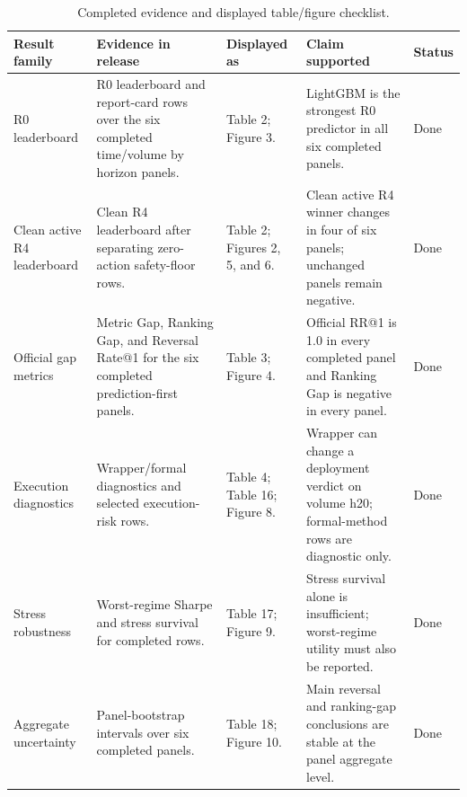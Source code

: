 \begin{table}[t]
\centering
\caption{Completed evidence and displayed table/figure checklist.}
\label{tab:table_20_display_checklist}
\begin{tabular}{lllll}
\toprule
Result family & Evidence in release & Displayed as & Claim supported & Status \\
\midrule
R0 leaderboard & R0 leaderboard and report-card rows over the six completed time/volume by horizon panels. & Table 2; Figure 3. & LightGBM is the strongest R0 predictor in all six completed panels. & Done \\
Clean active R4 leaderboard & Clean R4 leaderboard after separating zero-action safety-floor rows. & Table 2; Figures 2, 5, and 6. & Clean active R4 winner changes in four of six panels; unchanged panels remain negative. & Done \\
Official gap metrics & Metric Gap, Ranking Gap, and Reversal Rate@1 for the six completed prediction-first panels. & Table 3; Figure 4. & Official RR@1 is 1.0 in every completed panel and Ranking Gap is negative in every panel. & Done \\
Execution diagnostics & Wrapper/formal diagnostics and selected execution-risk rows. & Table 4; Table 16; Figure 8. & Wrapper can change a deployment verdict on volume h20; formal-method rows are diagnostic only. & Done \\
Stress robustness & Worst-regime Sharpe and stress survival for completed rows. & Table 17; Figure 9. & Stress survival alone is insufficient; worst-regime utility must also be reported. & Done \\
Aggregate uncertainty & Panel-bootstrap intervals over six completed panels. & Table 18; Figure 10. & Main reversal and ranking-gap conclusions are stable at the panel aggregate level. & Done \\
\bottomrule
\end{tabular}
\end{table}
